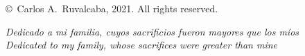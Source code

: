 % 
% 
% 
% 
%





\newtheorem{theorem}{Theorem}[section]
\newtheorem{proposition}{Proposition}[section]
\newtheorem{corollary}{Corollary}[section]
\newtheorem{remark}{Remark}[section]

\captionsetup[subfigure]{labelfont=rm}


   \frontmatter

   \pagestyle{prelim}
   
   
   \newpage
   
	 \thispagestyle{empty}
	 \begin{titlepage}
	 \vspace*{\fill}
	 \begin{center}
		 \copyright \ Carlos A.\ Ruvalcaba, 2021.  All rights reserved.  
	 \end{center}
	 \end{titlepage}
	 \newpage
	
	 \thispagestyle{plain}
	 \vspace*{20em}
	 \begin{center}\emph{
    Dedicado a mi familia, cuyos sacrificios fueron mayores que los míos \\
    Dedicated to my family, whose sacrifices were greater than mine} 
	 \end{center}
   \newpage
      
   \doublespacing

   \tableofcontents

   \newpage
   
   \newpage
   
   
